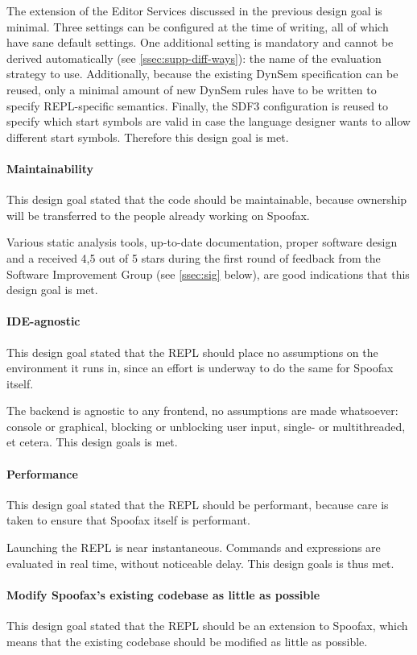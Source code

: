 The extension of the Editor Services discussed in the previous design goal is
minimal. Three settings can be configured at the time of writing, all of which
have sane default settings. One additional setting is mandatory and cannot be
derived automatically (see \cref{ssec:supp-diff-ways}): the name of the
evaluation strategy to use. Additionally, because the existing DynSem
specification can be reused, only a minimal amount of new DynSem rules have to
be written to specify REPL-specific semantics. Finally, the SDF3 configuration
is reused to specify which start symbols are valid in case the language designer
wants to allow different start symbols. Therefore this design goal is met.

\paragraph{Maintainability} This design goal stated that the code should be
maintainable, because ownership will be transferred to the people already
working on Spoofax.

Various static analysis tools, up-to-date documentation, proper software design
and a received 4,5 out of 5 stars during the first round of feedback from the
Software Improvement Group (see \cref{ssec:sig} below), are good indications that
this design goal is met.

\paragraph{IDE-agnostic} This design goal stated that the REPL should place no
assumptions on the environment it runs in, since an effort is underway to do the
same for Spoofax itself.

The backend is agnostic to any frontend, no assumptions are made whatsoever:
console or graphical, blocking or unblocking user input, single- or
multithreaded, et cetera. This design goals is met.

\paragraph{Performance} This design goal stated that the REPL should be
performant, because care is taken to ensure that Spoofax itself is performant.

Launching the REPL is near instantaneous. Commands and expressions are evaluated
in real time, without noticeable delay. This design goals is thus met.

\paragraph{Modify Spoofax's existing codebase as little as possible} This design
goal stated that the REPL should be an extension to Spoofax, which means that
the existing codebase should be modified as little as possible.


